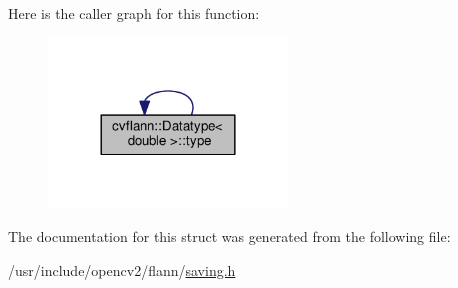 Here is the caller graph for this function\-:\nopagebreak
\begin{figure}[H]
\begin{center}
\leavevmode
\includegraphics[width=180pt]{structcvflann_1_1Datatype_3_01double_01_4_a32eef7c206baf6c5743271c2a6248291_icgraph}
\end{center}
\end{figure}




The documentation for this struct was generated from the following file\-:\begin{DoxyCompactItemize}
\item 
/usr/include/opencv2/flann/\hyperlink{saving_8h}{saving.\-h}\end{DoxyCompactItemize}
